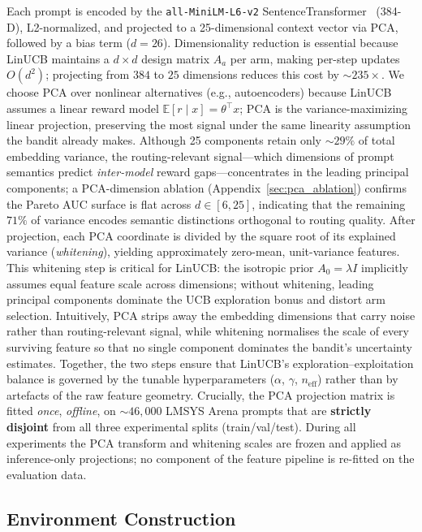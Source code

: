 Each prompt is encoded by the \texttt{all-MiniLM-L6-v2} SentenceTransformer~\cite{reimers2019sentence} (384-D), L2-normalized, and projected to a 25-dimensional context vector via PCA, followed by a bias term ($d{=}26$).
Dimensionality reduction is essential because LinUCB maintains a $d \times d$ design matrix $A_a$ per arm, making per-step updates $O(d^2)$; projecting from $384$ to $25$ dimensions reduces this cost by ${\sim}235\times$.
We choose PCA over nonlinear alternatives (e.g., autoencoders) because LinUCB assumes a linear reward model $\mathbb{E}[r \mid x] = \theta^\top x$; PCA is the variance-maximizing linear projection, preserving the most signal under the same linearity assumption the bandit already makes.
Although 25 components retain only ${\sim}29\%$ of total embedding variance, the routing-relevant signal---which dimensions of prompt semantics predict \emph{inter-model} reward gaps---concentrates in the leading principal components; a PCA-dimension ablation (Appendix~\ref{sec:pca_ablation}) confirms the Pareto AUC surface is flat across $d \in [6, 25]$, indicating that the remaining $71\%$ of variance encodes semantic distinctions orthogonal to routing quality.
After projection, each PCA coordinate is divided by the square root of its explained variance (\emph{whitening}), yielding approximately zero-mean, unit-variance features.
This whitening step is critical for LinUCB: the isotropic prior $A_0 = \lambda I$ implicitly assumes equal feature scale across dimensions; without whitening, leading principal components dominate the UCB exploration bonus and distort arm selection.
Intuitively, PCA strips away the embedding dimensions that carry noise rather than routing-relevant signal, while whitening normalises the scale of every surviving feature so that no single component dominates the bandit's uncertainty estimates.
Together, the two steps ensure that LinUCB's exploration--exploitation balance is governed by the tunable hyperparameters ($\alpha$, $\gamma$, $n_\text{eff}$) rather than by artefacts of the raw feature geometry.
Crucially, the PCA projection matrix is fitted \emph{once}, \emph{offline}, on ${\sim}46{,}000$ LMSYS Arena prompts that are \textbf{strictly disjoint} from all three experimental splits (train/val/test).
During all experiments the PCA transform and whitening scales are frozen and applied as inference-only projections; no component of the feature pipeline is re-fitted on the evaluation data.

\subsection{Environment Construction}

